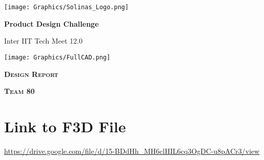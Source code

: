 \documentclass[a4,10pt]{report}
\begin{document}
\selectfont
\begin{titlepage}

\vspace{40mm}

	\centering

    \texttt{[image: Graphics/Solinas\_Logo.png]}
    
	\vspace{-0.8cm}


	{\huge \bfseries Product Design Challenge \par}
	{\huge Inter IIT Tech Meet 12.0\par}
        \vspace{1cm}
	\begin{center}
	    \texttt{[image: Graphics/FullCAD.png]}
	\end{center}
        \vspace{1cm}
	{\scshape\Large \textbf{Design Report}\par}
	\vspace{0.5cm}
	{\scshape\Large \textbf{Team 80}\par}


        \newpage


\vfill
\end{titlepage}

\section*{Link to F3D File}
\href{Link}{https://drive.google.com/file/d/15-BDdHh_MH6clHIL6cq3OgDC-u8pACr3/view}
\end{document}
